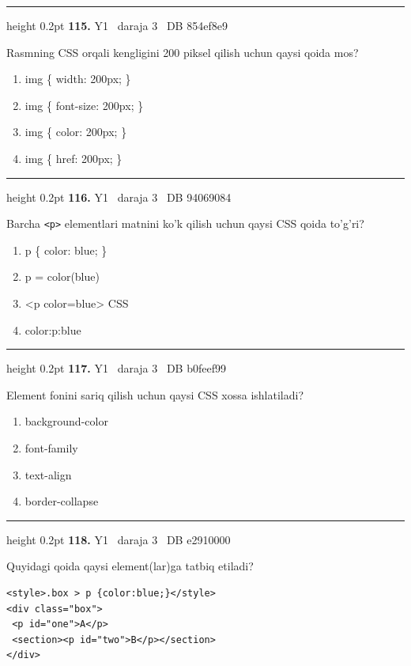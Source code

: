 \documentclass[10pt,a4paper,oneside]{article}
\begin{document}
\vspace{2mm}\hrule height 0.2pt \vspace{4mm}
\hypertarget{q115}{\textbf{\color{ink}115.}}  {\color{muted}\scriptsize Y1 \textbullet\ daraja 3 \textbullet\ DB 854ef8e9}
\par
Rasmning CSS orqali kengligini 200 piksel qilish uchun qaysi qoida mos?
\begin{enumerate}[label=\Alph*),leftmargin=9mm]
\item img \{ width: 200px; \}
\item img \{ font-size: 200px; \}
\item img \{ color: 200px; \}
\item img \{ href: 200px; \}
\end{enumerate}
\vspace{2mm}\hrule height 0.2pt \vspace{4mm}
\hypertarget{q116}{\textbf{\color{ink}116.}}  {\color{muted}\scriptsize Y1 \textbullet\ daraja 3 \textbullet\ DB 94069084}
\par
Barcha \texttt{\textless{}p\textgreater{}} elementlari matnini ko'k qilish uchun qaysi CSS qoida to'g'ri?
\begin{enumerate}[label=\Alph*),leftmargin=9mm]
\item p \{ color: blue; \}
\item p = color(blue)
\item \textless{}p color=blue\textgreater{} CSS
\item color:p:blue
\end{enumerate}
\vspace{2mm}\hrule height 0.2pt \vspace{4mm}
\hypertarget{q117}{\textbf{\color{ink}117.}}  {\color{muted}\scriptsize Y1 \textbullet\ daraja 3 \textbullet\ DB b0feef99}
\par
Element fonini sariq qilish uchun qaysi CSS xossa ishlatiladi?
\begin{enumerate}[label=\Alph*),leftmargin=9mm]
\item background-color
\item font-family
\item text-align
\item border-collapse
\end{enumerate}
\vspace{2mm}\hrule height 0.2pt \vspace{4mm}
\hypertarget{q118}{\textbf{\color{ink}118.}}  {\color{muted}\scriptsize Y1 \textbullet\ daraja 3 \textbullet\ DB e2910000}
\par
Quyidagi qoida qaysi element(lar)ga tatbiq etiladi?\par
\begin{lstlisting}
<style>.box > p {color:blue;}</style>
<div class="box">
 <p id="one">A</p>
 <section><p id="two">B</p></section>
</div>
\end{lstlisting}
\end{document}
